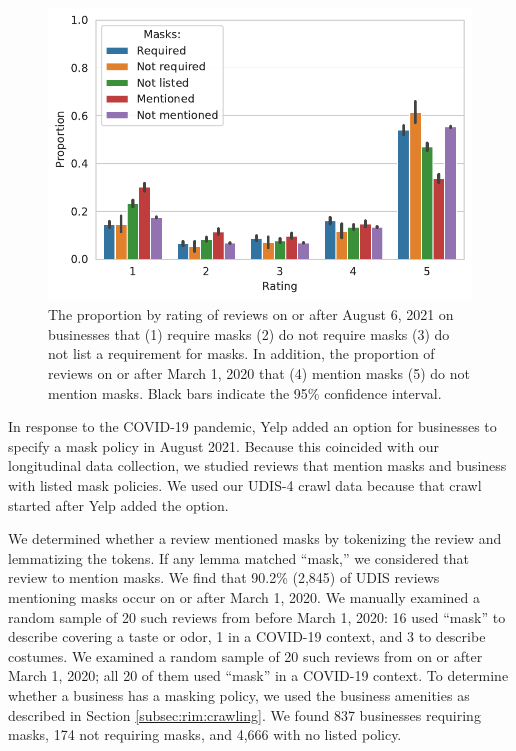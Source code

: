 \begin{figure}[t]
    \centering
    \includegraphics[width=0.9\columnwidth]{chapters/reviews/figures/proportion_Masks_by_Rating_usa.pdf}
    \caption[Review rating and masking]{The proportion by rating of reviews on or after August 6, 2021 on businesses that (1) require masks (2) do not require masks (3) do not list a requirement for masks. In addition, the proportion of reviews on or after March 1, 2020 that (4) mention masks (5) do not mention masks. Black bars indicate the 95\% confidence interval.}
    \label{fig:proportion_Masks mentions_masks required_by_rating_usa}
\end{figure}

In response to the COVID-19 pandemic, Yelp added an option for businesses to specify a mask policy in August 2021. Because this coincided with our longitudinal data collection, we studied reviews that mention masks and business with listed mask policies. We used our UDIS-4 crawl data because that crawl started after Yelp added the option. 

We determined whether a review mentioned masks by tokenizing the review and lemmatizing the tokens. If any lemma matched ``mask,'' we considered that review to mention masks. We find that 90.2\% (2,845) of UDIS reviews mentioning masks occur on or after March 1, 2020. We manually examined a random sample of 20 such reviews from before March 1, 2020: 16 used ``mask'' to describe covering a taste or odor, 1 in a COVID-19 context, and 3 to describe costumes. We examined a random sample of 20 such reviews from on or after March 1, 2020; all 20 of them used ``mask'' in a COVID-19 context. To determine whether a business has a masking policy, we used the business amenities as described in Section \ref{subsec:rim:crawling}. We found 837 businesses requiring masks, 174 not requiring masks, and 4,666 with no listed policy.

